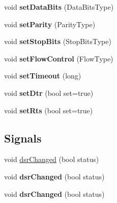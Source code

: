 \begin{DoxyCompactItemize}
void {\bfseries set\+Data\+Bits} (Data\+Bits\+Type)
\item 
\mbox{\label{class_qext_serial_port_ac9c0368ed4250c2c94dfc91778c23950}} 
void {\bfseries set\+Parity} (Parity\+Type)
\item 
\mbox{\label{class_qext_serial_port_aec0710cffb2bf37672b2ada711ea8857}} 
void {\bfseries set\+Stop\+Bits} (Stop\+Bits\+Type)
\item 
\mbox{\label{class_qext_serial_port_a9cc5588ca4cff0287e1766915436ee05}} 
void {\bfseries set\+Flow\+Control} (Flow\+Type)
\item 
\mbox{\label{class_qext_serial_port_adfedf676b5114c7372343c341fe6b8e4}} 
void {\bfseries set\+Timeout} (long)
\item 
\mbox{\label{class_qext_serial_port_a5dd95caf830f6855c26c0ae70b705cea}} 
void {\bfseries set\+Dtr} (bool set=true)
\item 
\mbox{\label{class_qext_serial_port_a177dd7a9926ee64164d520745fafbcd0}} 
void {\bfseries set\+Rts} (bool set=true)
\end{DoxyCompactItemize}
\subsection*{Signals}
\begin{DoxyCompactItemize}
\item 
void \mbox{\hyperlink{class_qext_serial_port_a6e3dbe614da07b32ad526428c0321c2e}{dsr\+Changed}} (bool status)
\item 
\mbox{\label{class_qext_serial_port_a6e3dbe614da07b32ad526428c0321c2e}} 
void {\bfseries dsr\+Changed} (bool status)
\item 
\mbox{\label{class_qext_serial_port_a6e3dbe614da07b32ad526428c0321c2e}} 
void {\bfseries dsr\+Changed} (bool status)
\end{DoxyCompactItemize}
